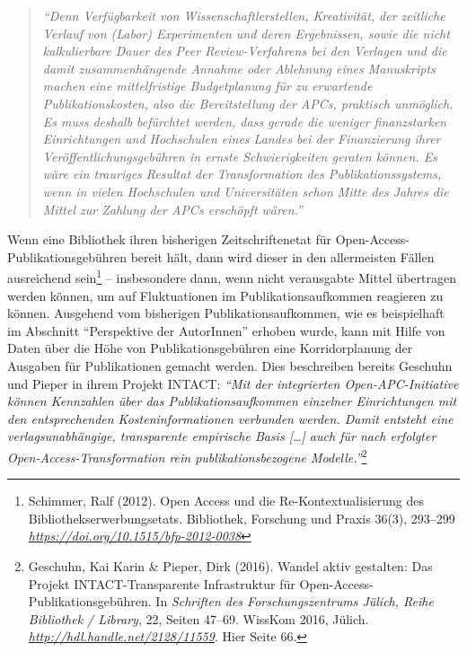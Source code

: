 \documentclass[a4paper,
fontsize=11pt,
oneside,
numbers=noperiodatend,
parskip=half-,
bibliography=totoc,
final
]{scrartcl}
\begin{document}
\begin{quote}
\emph{\enquote{Denn Verfügbarkeit von Wissenschaftlerstellen,
Kreativität, der zeitliche Verlauf von (Labor) Experimenten und deren
Ergebnissen, sowie die nicht kalkulierbare Dauer des Peer
Review-Verfahrens bei den Verlagen und die damit zusammenhängende
Annahme oder Ablehnung eines Manuskripts machen eine mittelfristige
Budgetplanung für zu erwartende Publikationskosten, also die
Bereitstellung der APCs, praktisch unmöglich. Es muss deshalb befürchtet
werden, dass gerade die weniger finanzstarken Einrichtungen und
Hochschulen eines Landes bei der Finanzierung ihrer
Veröffentlichungsgebühren in ernste Schwierigkeiten geraten können. Es
wäre ein trauriges Resultat der Transformation des Publikationssystems,
wenn in vielen Hochschulen und Universitäten schon Mitte des Jahres die
Mittel zur Zahlung der APCs erschöpft wären.}}
\end{quote}

Wenn eine Bibliothek ihren bisherigen Zeitschriftenetat für
Open-Access-Publikationsgebühren bereit hält, dann wird dieser in den
allermeisten Fällen ausreichend sein\footnote{Schimmer, Ralf (2012).
  Open Access und die Re-Kontextualisierung des
  Bibliothekserwerbungsetats. Bibliothek, Forschung und Praxis 36(3),
  293--299
  \href{https://doi.org/10.1515/bfp-2012-0038}{\emph{https://doi.org/10.1515/bfp-2012-0038}}}
-- insbesondere dann, wenn nicht verausgabte Mittel übertragen werden
können, um auf Fluktuationen im Publikationsaufkommen reagieren zu
können. Ausgehend vom bisherigen Publikationsaufkommen, wie es
beispielhaft im Abschnitt \enquote{Perspektive der AutorInnen} erhoben
wurde, kann mit Hilfe von Daten über die Höhe von Publikationsgebühren
eine Korridorplanung der Ausgaben für Publikationen gemacht werden. Dies
beschreiben bereits Geschuhn und Pieper in ihrem Projekt INTACT:
\emph{\enquote{Mit der integrierten Open-APC-Initiative können
Kennzahlen über das Publikationsaufkommen einzelner Einrichtungen mit
den entsprechenden Kosteninformationen verbunden werden. Damit entsteht
eine verlagsunabhängige, transparente empirische Basis {[}\ldots{}{]}
auch für nach erfolgter Open-Access-Transformation rein
publikationsbezogene Modelle.}}\footnote{Geschuhn, Kai Karin \& Pieper,
  Dirk (2016). Wandel aktiv gestalten: Das Projekt INTACT-Transparente
  Infrastruktur für Open-Access-Publikationsgebühren. In \emph{Schriften
  des Forschungszentrums Jülich, Reihe Bibliothek / Library}, 22, Seiten
  47--69. WissKom 2016, Jülich.
  \href{http://hdl.handle.net/2128/11559}{\emph{http://hdl.handle.net/2128/11559}}.
  Hier Seite 66.}
\end{document}
